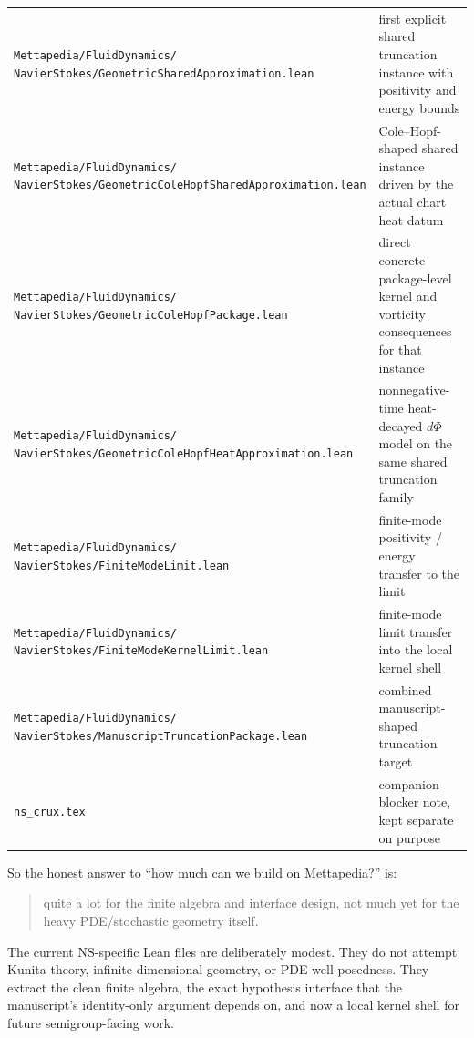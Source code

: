 \documentclass[11pt]{article}
\theoremstyle{remark}
\begin{document}
\begin{center}
\begin{tabular}{p{}p{}}
\shortstack[l]{\texttt{Mettapedia/FluidDynamics/}\\\texttt{NavierStokes/GeometricSharedApproximation.lean}} & first explicit shared truncation instance with positivity and energy bounds \\
\shortstack[l]{\texttt{Mettapedia/FluidDynamics/}\\\texttt{NavierStokes/GeometricColeHopfSharedApproximation.lean}} & Cole--Hopf-shaped shared instance driven by the actual chart heat datum \\
\shortstack[l]{\texttt{Mettapedia/FluidDynamics/}\\\texttt{NavierStokes/GeometricColeHopfPackage.lean}} & direct concrete package-level kernel and vorticity consequences for that instance \\
\shortstack[l]{\texttt{Mettapedia/FluidDynamics/}\\\texttt{NavierStokes/GeometricColeHopfHeatApproximation.lean}} & nonnegative-time heat-decayed \(d\Phi\) model on the same shared truncation family \\
\shortstack[l]{\texttt{Mettapedia/FluidDynamics/}\\\texttt{NavierStokes/FiniteModeLimit.lean}} & finite-mode positivity / energy transfer to the limit \\
\shortstack[l]{\texttt{Mettapedia/FluidDynamics/}\\\texttt{NavierStokes/FiniteModeKernelLimit.lean}} & finite-mode limit transfer into the local kernel shell \\
\shortstack[l]{\texttt{Mettapedia/FluidDynamics/}\\\texttt{NavierStokes/ManuscriptTruncationPackage.lean}} & combined manuscript-shaped truncation target \\
\texttt{ns\_crux.tex} & companion blocker note, kept separate on purpose \\
\bottomrule
\end{tabular}
\end{center}

So the honest answer to ``how much can we build on Mettapedia?'' is:
\begin{quote}
quite a lot for the finite algebra and interface design, not much yet for the
heavy PDE/stochastic geometry itself.
\end{quote}

The current NS-specific Lean files are deliberately modest.  They do not attempt
Kunita theory, infinite-dimensional geometry, or PDE well-posedness.  They
extract the clean finite algebra, the exact hypothesis interface that the
manuscript's identity-only argument depends on, and now a local kernel shell
for future semigroup-facing work.
\end{document}
